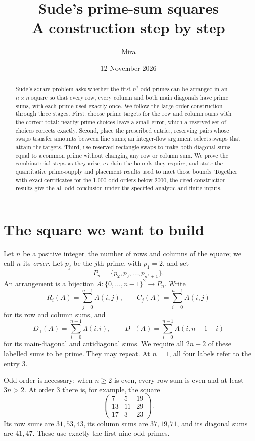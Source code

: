 \documentclass[11pt]{article}
\title{Sude's prime-sum squares\\[0.3em]\large A construction step by step}
\author{Mira}
\date{12 November 2026}
\theoremstyle{definition}
\begin{document}
\maketitle

\begin{abstract}
Sude's square problem asks whether the first \(n^2\) odd primes can be arranged
in an \(n\times n\) square so that every row, every column and both main diagonals
have prime sums, with each prime used exactly once. We follow the large-order
construction through three stages. First, choose prime targets for the row
and column sums with the correct total: nearby prime choices leave a small
error, which a reserved set of choices corrects exactly. Second, place the
prescribed entries, reserving pairs whose swaps transfer amounts between line
sums; an integer-flow argument selects swaps that attain the targets. Third,
use reserved rectangle swaps to make both diagonal sums equal to a common
prime without changing any row or column sum. We prove the combinatorial steps
as they arise, explain the bounds they require, and state the quantitative
prime-supply and placement results used to meet those bounds. Together with
exact certificates for the 1,000 odd orders below 2000, the cited construction
results give the all-odd conclusion under the specified analytic and finite inputs.
\end{abstract}

\section{The square we want to build}\label{sec:problem}

Let \(n\) be a positive integer, the number of rows and columns of the square;
we call \(n\) its \emph{order}. Let \(p_j\) be the \(j\)th prime, with
\(p_1=2\), and set
\[
 P_n=\{p_2,p_3,\ldots,p_{n^2+1}\}.
\]
An arrangement is a bijection
\(A:\{0,\ldots,n-1\}^2\longrightarrow P_n\). Write
\[
 R_i(A)=\sum_{j=0}^{n-1}A(i,j),\qquad
 C_j(A)=\sum_{i=0}^{n-1}A(i,j)
\]
for its row and column sums, and
\[
 D_+(A)=\sum_{i=0}^{n-1}A(i,i),\qquad
 D_-(A)=\sum_{i=0}^{n-1}A(i,n-1-i)
\]
for its main-diagonal and antidiagonal sums. We require all \(2n+2\) of these
labelled sums to be prime. They may repeat. At \(n=1\), all four labels refer
to the entry 3.

Odd order is necessary: when \(n\ge2\) is even, every row sum is even and
at least \(3n>2\). At order 3 there is, for example, the square
\[
 \begin{pmatrix}7&5&19\\13&11&29\\17&3&23\end{pmatrix}.
\]
Its row sums are \(31,53,43\), its column sums are \(37,19,71\), and its diagonal
sums are \(41,47\). These use exactly the first nine odd primes.
\end{document}
